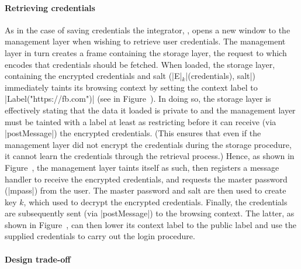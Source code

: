 %

\paragraph{Retrieving credentials}
%
As in the case of saving credentials the integrator, ,
opens a new window to the management layer when wishing to retrieve
user credentials.
%
The management layer in turn creates a frame containing the storage
layer, the request to which encodes that  credentials
should be fetched.
%
When loaded, the storage layer, containing the encrypted credentials
and salt (\js|E|$_k$\js|(credentials), salt|) immediately taints its
browsing context by setting the context label to
\js|Label("https://fb.com")| (see in Figure~).
%
In doing so, the storage layer is effectively stating that the data it
loaded is private to  and the management layer must be
tainted with a label at least as restricting before it can receive
(via \js|postMessage|) the encrypted credentials.
%
(This ensures that even if the management layer did not encrypt the
credentials during the storage procedure, it cannot learn the
credentials through the retrieval process.)
%
Hence, as shown in Figure~, the management
layer taints itself as such, then registers a message handler to
receive the encrypted credentials, and requests the master password
(\js|mpass|) from the user. 
%
The master password and salt are then used to create key $k$, which
used to decrypt the encrypted credentials.
%
Finally, the credentials are subsequently sent (via \js|postMessage|)
to the  browsing context.
%
The latter, as shown in Figure~, can then lower
its context label to the public label and use the supplied credentials
to carry out the login procedure.


\paragraph{Design trade-off}

